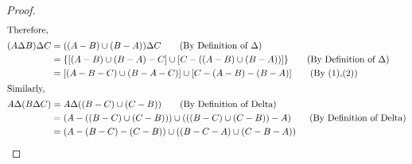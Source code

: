 \documentclass{article}
\begin{document}
\begin{proof}
\begin{align*}
        \intertext{Therefore,}
        (A \Delta B )\Delta C &= ((A - B) \cup (B- A)) \Delta C\tag{By Definition of $\Delta$}\\
        &= \{[(A - B) \cup (B - A) - C] \cup [C - ((A - B) \cup (B - A))]\}\tag{By Definition of $\Delta$}\\
        &= [(A - B - C) \cup (B-A-C)] \cup [C - (A-B) - (B-A)]\tag{By (1),(2)}\\
        \intertext{Similarly,}
        A\Delta(B\Delta C) &= A\Delta ((B-C) \cup (C-B)) \tag{By Definition of Delta}\\
        &= (A - ((B-C) \cup (C-B))) \cup (((B-C) \cup (C-B)) - A)\tag{By Definition of Delta}\\
        &= (A - (B-C) - (C-B)) \cup ((B-C-A) \cup (C-B-A))
    \end{align*} 



\end{proof}
\end{document}
